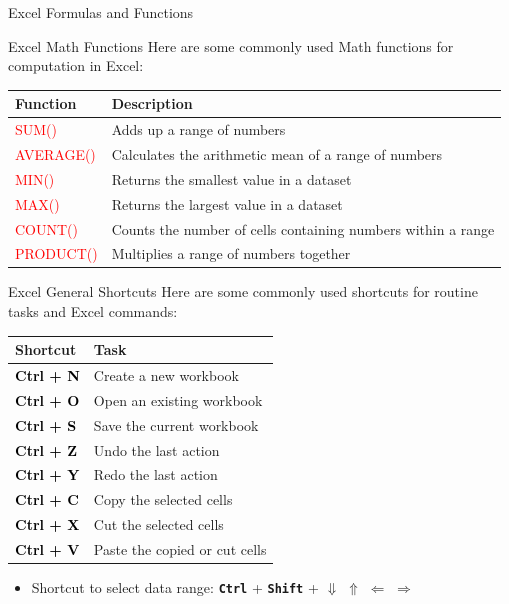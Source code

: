 \documentclass[
  10pt,
  ignorenonframetext,
]{beamer}
\providecommand{\tightlist}{%
  \setlength{\itemsep}{0pt}\setlength{\parskip}{0pt}}
\begin{document}
\begin{frame}{Excel Formulas and Functions}
\protect\hypertarget{excel-formulas-and-functions-3}{}
\begin{block}{Excel Math Functions}
\protect\hypertarget{excel-math-functions-1}{}
Here are some commonly used Math functions for computation in Excel:

\begin{table}
\centering
\begin{tabular}[t]{>{}ll}
\toprule
Function & Description\\
\midrule
\textcolor{red}{SUM()} & Adds up a range of numbers\\
\textcolor{red}{AVERAGE()} & Calculates the arithmetic mean of a range of numbers\\
\textcolor{red}{MIN()} & Returns the smallest value in a dataset\\
\textcolor{red}{MAX()} & Returns the largest value in a dataset\\
\textcolor{red}{COUNT()} & Counts the number of cells containing numbers within a range\\
\textcolor{red}{PRODUCT()} & Multiplies a range of numbers together\\
\bottomrule
\end{tabular}
\end{table}
\end{block}
\end{frame}

\begin{frame}[fragile]{Excel General Shortcuts}
\protect\hypertarget{excel-general-shortcuts}{}
Here are some commonly used shortcuts for routine tasks and Excel
commands:

\begin{table}
\centering
\begin{tabular}[t]{>{}ll}
\toprule
Shortcut & Task\\
\midrule
\textcolor{black}{\textbf{Ctrl + N}} & Create a new workbook\\
\textcolor{black}{\textbf{Ctrl + O}} & Open an existing workbook\\
\textcolor{black}{\textbf{Ctrl + S}} & Save the current workbook\\
\textcolor{black}{\textbf{Ctrl + Z}} & Undo the last action\\
\textcolor{black}{\textbf{Ctrl + Y}} & Redo the last action\\
\textcolor{black}{\textbf{Ctrl + C}} & Copy the selected cells\\
\textcolor{black}{\textbf{Ctrl + X}} & Cut the selected cells\\
\textcolor{black}{\textbf{Ctrl + V}} & Paste the copied or cut cells\\
\bottomrule
\end{tabular}
\end{table}

\begin{itemize}
\tightlist
\item
  Shortcut to select data range: \textbf{\texttt{Ctrl}} +
  \textbf{\texttt{Shift}} + \(\Downarrow\) \(\Uparrow\) \(\Leftarrow\)
  \(\Rightarrow\)
\end{itemize}
\end{frame}
\end{document}
